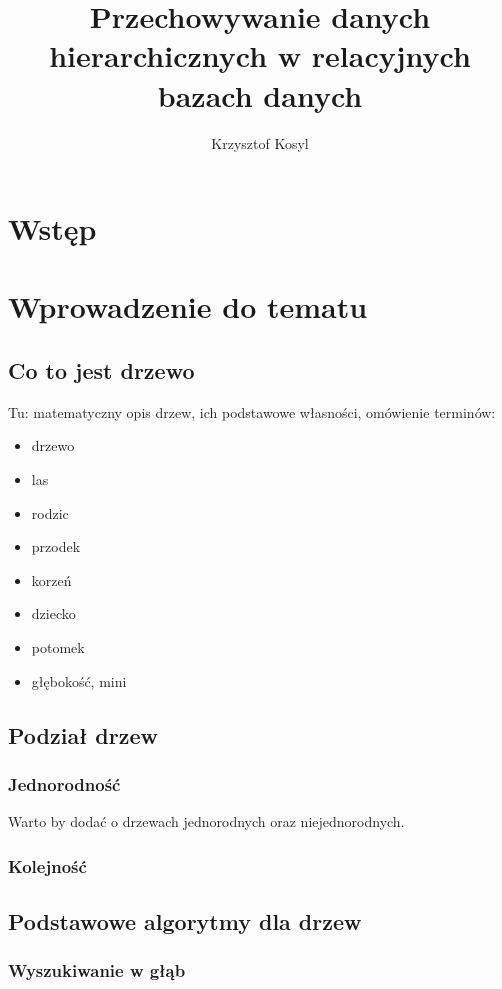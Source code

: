\documentclass[12pt,a4paper,intlimits,oneside]{report}
\author{Krzysztof Kosyl}
\title{Przechowywanie danych hierarchicznych w relacyjnych bazach danych}
\begin{document}



\tableofcontents{}

\chapter*{Wstęp}




\chapter{Wprowadzenie do tematu}

\section{Co to jest drzewo}

Tu: matematyczny opis drzew, ich podstawowe własności, omówienie terminów:
\begin{itemize}
	\item drzewo
	\item las
	\item rodzic
	\item przodek
	\item korzeń
	\item dziecko
	\item potomek
	\item głębokość, mini
\end{itemize}

\section{Podział drzew}
\subsection{Jednorodność}
Warto by dodać o drzewach jednorodnych oraz niejednorodnych.

\subsection{Kolejność}


\section{Podstawowe algorytmy dla drzew}
\subsection{Wyszukiwanie w głąb}
\end{document}
